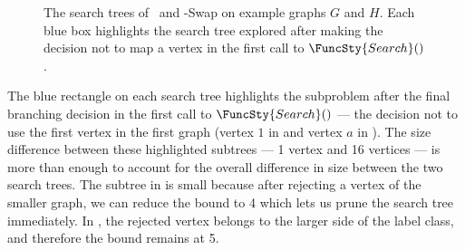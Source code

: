 \begin{figure}[htb]
    \centering
    \caption{The search trees of \McSplit\ and \McSplit-Swap on example graphs $G$ and $H$.  Each blue box
            highlights the search tree explored after making the decision not to map a vertex in the first
            call to $\FuncSty{Search}()$.}
        \label{figure:search-trees-with-swapping}
\end{figure}

The blue rectangle on each search tree highlights the subproblem after the final branching
decision in the first call to $\FuncSty{Search}()$ --- the decision not to use the first
vertex in the first graph (vertex $1$ in 
and vertex $a$ in ).  The size difference between
these highlighted subtrees --- 1 vertex and 16 vertices --- is more than enough to account
for the overall difference in size between the two search trees.  The subtree in
 is small because after rejecting a vertex of
the smaller graph, we can reduce the bound to 4 which lets us prune the search tree immediately.
In , the rejected vertex belongs to the larger
side of the label class, and therefore the bound remains at 5.

